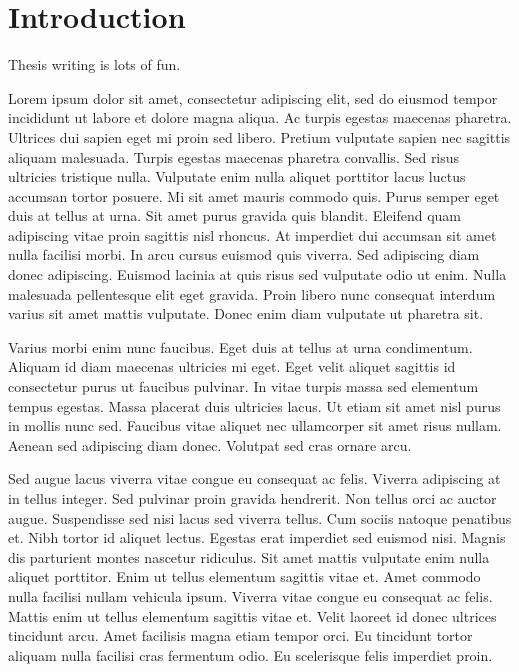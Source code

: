 \chapter{Introduction}
Thesis writing is lots of fun.

Lorem ipsum dolor sit amet, consectetur adipiscing elit, sed do eiusmod tempor incididunt ut labore et dolore magna aliqua. Ac turpis egestas maecenas pharetra. Ultrices dui sapien eget mi proin sed libero. Pretium vulputate sapien nec sagittis aliquam malesuada. Turpis egestas maecenas pharetra convallis. Sed risus ultricies tristique nulla. Vulputate enim nulla aliquet porttitor lacus luctus accumsan tortor posuere. Mi sit amet mauris commodo quis. Purus semper eget duis at tellus at urna. Sit amet purus gravida quis blandit. Eleifend quam adipiscing vitae proin sagittis nisl rhoncus. At imperdiet dui accumsan sit amet nulla facilisi morbi. In arcu cursus euismod quis viverra. Sed adipiscing diam donec adipiscing. Euismod lacinia at quis risus sed vulputate odio ut enim. Nulla malesuada pellentesque elit eget gravida. Proin libero nunc consequat interdum varius sit amet mattis vulputate. Donec enim diam vulputate ut pharetra sit.

Varius morbi enim nunc faucibus. Eget duis at tellus at urna condimentum. Aliquam id diam maecenas ultricies mi eget. Eget velit aliquet sagittis id consectetur purus ut faucibus pulvinar. In vitae turpis massa sed elementum tempus egestas. Massa placerat duis ultricies lacus. Ut etiam sit amet nisl purus in mollis nunc sed. Faucibus vitae aliquet nec ullamcorper sit amet risus nullam. Aenean sed adipiscing diam donec. Volutpat sed cras ornare arcu.

Sed augue lacus viverra vitae congue eu consequat ac felis. Viverra adipiscing at in tellus integer. Sed pulvinar proin gravida hendrerit. Non tellus orci ac auctor augue. Suspendisse sed nisi lacus sed viverra tellus. Cum sociis natoque penatibus et. Nibh tortor id aliquet lectus. Egestas erat imperdiet sed euismod nisi. Magnis dis parturient montes nascetur ridiculus. Sit amet mattis vulputate enim nulla aliquet porttitor. Enim ut tellus elementum sagittis vitae et. Amet commodo nulla facilisi nullam vehicula ipsum. Viverra vitae congue eu consequat ac felis. Mattis enim ut tellus elementum sagittis vitae et. Velit laoreet id donec ultrices tincidunt arcu. Amet facilisis magna etiam tempor orci. Eu tincidunt tortor aliquam nulla facilisi cras fermentum odio. Eu scelerisque felis imperdiet proin.

